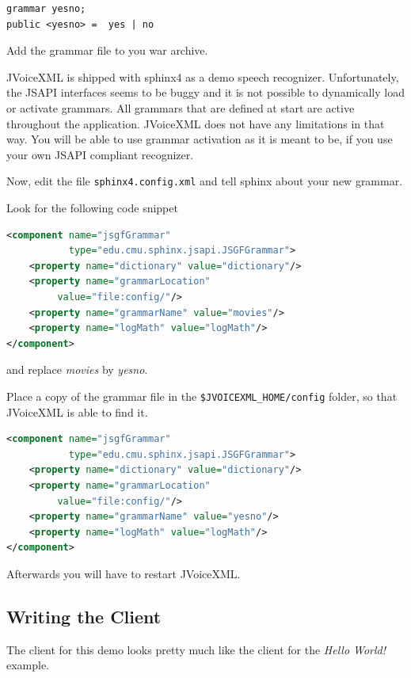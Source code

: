 \documentclass[11pt,a4paper]{article}
\begin{document}
\begin{lstlisting}
grammar yesno;
public <yesno> =  yes | no

\end{lstlisting}

Add the grammar file to you war archive.

JVoiceXML is shipped with sphinx4 as a demo speech recognizer. Unfortunately,
the JSAPI interfaces seems to be buggy and it is not possible to dynamically
load or activate grammars. All grammars that are defined at start are active 
throughout the application. JVoiceXML does not have any limitations in that way.
You will be able to use grammar activation as it is meant to be, if you use your
own JSAPI compliant recognizer.

Now, edit the file \texttt{sphinx4.config.xml} and tell sphinx about your new 
grammar.

Look for the following code snippet

\begin{lstlisting}[language=XML]
<component name="jsgfGrammar" 
           type="edu.cmu.sphinx.jsapi.JSGFGrammar">
    <property name="dictionary" value="dictionary"/>
    <property name="grammarLocation"
         value="file:config/"/>
    <property name="grammarName" value="movies"/>
    <property name="logMath" value="logMath"/>
</component>
\end{lstlisting}

and replace \emph{movies} by \emph{yesno}.

Place a copy of the grammar file in the \texttt{\$JVOICE\-XML\_HOME/config}
folder, so that JVoiceXML is able to find it.

\begin{lstlisting}[language=XML]
<component name="jsgfGrammar" 
           type="edu.cmu.sphinx.jsapi.JSGFGrammar">
    <property name="dictionary" value="dictionary"/>
    <property name="grammarLocation"
         value="file:config/"/>
    <property name="grammarName" value="yesno"/>
    <property name="logMath" value="logMath"/>
</component>
\end{lstlisting}

Afterwards you will have to restart JVoiceXML.

\subsection{Writing the Client}

The client for this demo looks pretty much like the client for the \emph{Hello
World!} example.
\end{document}
